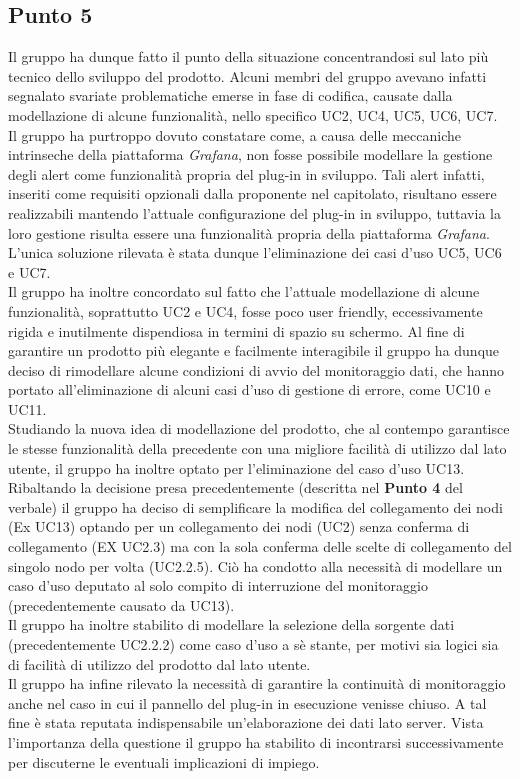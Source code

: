 \subsection{Punto 5}
Il gruppo ha dunque fatto il punto della situazione concentrandosi sul lato più tecnico dello sviluppo del prodotto. Alcuni membri del gruppo avevano infatti segnalato svariate problematiche emerse in fase di codifica, causate dalla modellazione di alcune funzionalità, nello specifico UC2, UC4, UC5, UC6, UC7.\\
Il gruppo ha purtroppo dovuto constatare come, a causa delle meccaniche intrinseche della piattaforma \textit{Grafana}, non fosse possibile modellare la gestione degli alert come funzionalità propria del plug-in in sviluppo. Tali alert infatti, inseriti come requisiti opzionali dalla proponente nel capitolato, risultano essere realizzabili mantendo l'attuale configurazione del plug-in in sviluppo, tuttavia la loro gestione risulta essere una funzionalità propria della piattaforma \textit{Grafana}. L'unica soluzione rilevata è stata dunque l'eliminazione dei casi d'uso UC5, UC6 e UC7.\\
Il gruppo ha inoltre concordato sul fatto che l'attuale modellazione di alcune funzionalità, soprattutto UC2 e UC4, fosse poco user friendly, eccessivamente rigida e inutilmente dispendiosa in termini di spazio su schermo. Al fine di garantire un prodotto più elegante e facilmente interagibile il gruppo ha dunque deciso di rimodellare alcune condizioni di avvio del monitoraggio dati, che hanno portato all'eliminazione di alcuni casi d'uso di gestione di errore, come UC10 e UC11.\\
Studiando la nuova idea di modellazione del prodotto, che al contempo garantisce le stesse funzionalità della precedente con una migliore facilità di utilizzo dal lato utente, il gruppo ha inoltre optato per l'eliminazione del caso d'uso UC13. Ribaltando la decisione presa precedentemente (descritta nel \textbf{Punto 4} del verbale) il gruppo ha deciso di semplificare la modifica del collegamento dei nodi (Ex UC13) optando per un collegamento dei nodi (UC2) senza conferma di collegamento (EX UC2.3) ma con la sola conferma delle scelte di collegamento del singolo nodo per volta (UC2.2.5). Ciò ha condotto alla necessità di modellare un caso d'uso deputato al solo compito di interruzione del monitoraggio (precedentemente causato da UC13).\\
Il gruppo ha inoltre stabilito di modellare la selezione della sorgente dati (precedentemente UC2.2.2) come caso d'uso a sè stante, per motivi sia logici sia di facilità di utilizzo del prodotto dal lato utente.\\
Il gruppo ha infine rilevato la necessità di garantire la continuità di monitoraggio anche nel caso in cui il pannello del plug-in in esecuzione venisse chiuso. A tal fine è stata reputata indispensabile un'elaborazione dei dati lato server. Vista l'importanza della questione il gruppo ha stabilito di incontrarsi successivamente per discuterne le eventuali implicazioni di impiego.


